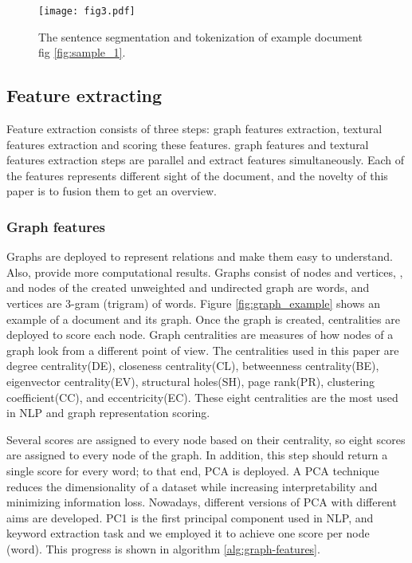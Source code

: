 \documentclass[3p]{elsarticle}
\begin{document}
\begin{figure}
    \centering
    \texttt{[image: fig3.pdf]}
    \caption{The sentence segmentation and tokenization of example document fig \ref{fig:sample_1}.}
    \label{fig:sample_2}
\end{figure}
\subsection{Feature extracting}
Feature extraction consists of three steps: graph features extraction, textural features extraction and scoring these features. graph features and textural features extraction steps are parallel and extract features simultaneously. Each of the features represents different sight of the document, and the novelty of this paper is to fusion them to get an overview.

\subsubsection{Graph features}
Graphs are deployed to represent relations and make them easy to understand. Also, provide more computational results. Graphs consist of nodes and vertices, , and nodes of the created unweighted and undirected graph are words, and vertices are 3-gram (trigram) of words. Figure \ref{fig:graph_example}  shows an example of a document and its graph. Once the graph is created, centralities are deployed to score each node. Graph centralities are measures of how nodes of a graph look from a different point of view. The centralities used in this paper are degree centrality(DE), closeness centrality(CL), betweenness centrality(BE), eigenvector centrality(EV), structural holes(SH), page rank(PR), clustering coefficient(CC), and eccentricity(EC). These eight centralities are the most used in NLP and graph representation scoring.

Several scores are assigned to every node based on their centrality, so eight scores are assigned to every node of the graph. In addition, this step should return a single score for every word; to that end, PCA is deployed. A PCA technique reduces the dimensionality of a dataset while increasing interpretability and minimizing information loss\cite{jolliffe_cadima_2016}. Nowadays, different versions of PCA with different aims are developed. PC1 is the first principal component used in NLP, and keyword extraction task\cite{vega2019multi} and we employed it to achieve one score per node (word). This progress is shown in algorithm \ref{alg:graph-features}.
   
\end{document}
